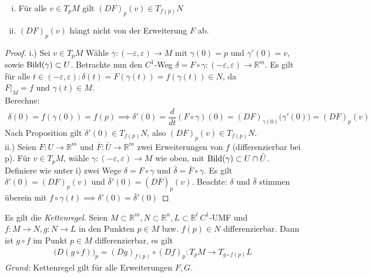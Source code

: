 \documentclass[../main.tex]{subfiles}
\begin{document}
\begin{lemma}
\begin{enumerate}[i.)]
    \item Für alle $v \in T_pM$ gilt $(DF)_p(v) \in T_{f(p)}N$
    \item $(DF)_p(v)$ hängt nicht von der Erweiterung $F$ ab.
\end{enumerate}
\end{lemma}
\begin{proof}
i.) Sei $v \in T_pM$ Wähle $\gamma : (-\varepsilon, \varepsilon) \to M$ mit $\gamma (0) =p$ und
$\gamma'(0)=v$, sowie $\operatorname{Bild}(\gamma) \subset U$. Betrachte nun den $C^1$-Weg
$\delta = F \circ \gamma : (-\varepsilon, \varepsilon) \to \mathbb{R}^m$.
Es gilt für alle $ t\in (-\varepsilon, \varepsilon) : \delta(t) = F(\gamma(t)) = f(\gamma(t)) \in N$, da $F\vert_M = f \text{ und } \gamma(t) \in M$. \\
Berechne:
\begin{align*}
    \delta(0) = f(\gamma(0)) = f(p) \implies \delta'(0) = \dfrac{d}{dt}(F \circ \gamma)(0) = (DF)_{\gamma(0)}\big(\gamma'(0)\big) = (DF)_p(v)
\end{align*}Nach Proposition gilt $\delta'(0) \in T_{f(p)}N$, also $(DF)_p(v) \in T_{f(p)}N$. \\

ii.)
Seien $F:U \to \mathbb{R}^m$ und $\bar F : \bar U \to \mathbb{R}^m$ zwei Erweiterungen von $f$ (differenzierbar bei p). Für $v \in T_pM$, wähle $\gamma:(-\varepsilon,\varepsilon)\to M$ wie oben, mit $\operatorname{Bild}(\gamma) \subset U \cap \bar U$. Definiere wie unter i) zwei Wege $\delta = F \circ \gamma$ und
$\bar \delta = \bar F \circ \gamma$.
Es gilt $\delta '(0)=(DF)_p(v)$ und $\bar \delta '(0) = (D\bar F)_p(v)$.
Beachte: $\delta$ und $\bar \delta$ stimmen überein mit $f \circ \gamma (t) \implies \delta'(0)=\bar \delta'(0)$
\end{proof}

\begin{remark}
Es gilt die \emph{Kettenregel}. Seien $M \subset \mathbb{R}^m,N\subset \mathbb{R}^n, L \subset \mathbb{R}^l \ C^1$-UMF und $f:M\to N , g:N \to L$ in den Punkten $p \in M$ bzw. $f(p)\in N$ differenzierbar.
Dann ist $g \circ f$ im Punkt $p \in M$ differenzierbar, es gilt
\begin{align*}
    \big(D(g \circ f)\big)_p = (Dg)_{f(p)} \circ (Df)_p : T_pM \to T_{g\circ f(p)}L
\end{align*}
\emph{Grund:} Kettenregel gilt für alle Erweiterungen $F, G$.
\end{remark}
\end{document}
